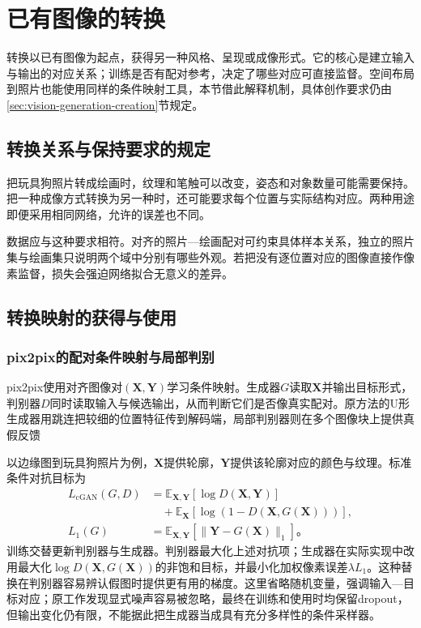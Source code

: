 \section{已有图像的转换}
\label{sec:vision-generation-translation}

转换以已有图像为起点，获得另一种风格、呈现或成像形式。它的核心是建立输入与输出的对应关系；训练是否有配对参考，决定了哪些对应可直接监督。空间布局到照片也能使用同样的条件映射工具，本节借此解释机制，具体创作要求仍由\ref{sec:vision-generation-creation}节规定。

\subsection{转换关系与保持要求的规定}
\label{sec:vision-generation-translation-requirements}

把玩具狗照片转成绘画时，纹理和笔触可以改变，姿态和对象数量可能需要保持。把一种成像方式转换为另一种时，还可能要求每个位置与实际结构对应。两种用途即便采用相同网络，允许的误差也不同。

数据应与这种要求相符。对齐的照片—绘画配对可约束具体样本关系，独立的照片集与绘画集只说明两个域中分别有哪些外观。若把没有逐位置对应的图像直接作像素监督，损失会强迫网络拟合无意义的差异。

\subsection{转换映射的获得与使用}
\label{sec:vision-generation-translation-mapping}

\subsubsection{pix2pix的配对条件映射与局部判别}
\label{sec:vision-generation-pix2pix}

pix2pix使用对齐图像对$(\bm{X},\bm{Y})$学习条件映射。生成器$G$读取$\bm{X}$并输出目标形式，判别器$D$同时读取输入与候选输出，从而判断它们是否像真实配对。原方法的U形生成器用跳连把较细的位置特征传到解码端，局部判别器则在多个图像块上提供真假反馈

以边缘图到玩具狗照片为例，$\bm{X}$提供轮廓，$\bm{Y}$提供该轮廓对应的颜色与纹理。标准条件对抗目标为
\begin{equation}
 \begin{aligned}
 L_{\mathrm{cGAN}}(G,D)
 &=\mathbb{E}_{\bm{X},\bm{Y}}[\log D(\bm{X},\bm{Y})]\\
 &\quad+\mathbb{E}_{\bm{X}}[
       \log(1-D(\bm{X},G(\bm{X})))],\\
 L_1(G)&=\mathbb{E}_{\bm{X},\bm{Y}}
       [\lVert\bm{Y}-G(\bm{X})\rVert_1]\text{。}
 \end{aligned}
 \label{eq:vision-pix2pix}
\end{equation}
训练交替更新判别器与生成器。判别器最大化上述对抗项；生成器在实际实现中改用最大化$\log D(\bm{X},G(\bm{X}))$的非饱和目标，并最小化加权像素误差$\lambda L_1$。这种替换在判别器容易辨认假图时提供更有用的梯度。这里省略随机变量，强调输入—目标对应；原工作发现显式噪声容易被忽略，最终在训练和使用时均保留dropout，但输出变化仍有限，不能据此把生成器当成具有充分多样性的条件采样器。

